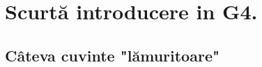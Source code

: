 \documentclass[xcolor=rgb]{beamer}
\begin{document}
	\section{Scurtă introducere in G4.} %
	




\subsection{Câteva cuvinte "lămuritoare"}
\end{document}

